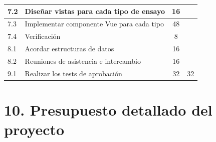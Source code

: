 \documentclass[11pt]{charter}
\begin{document}
\begin{table}[htpb]
\begin{tabular}{|l|l|c|c|}
7.2 & Diseñar vistas para cada tipo de ensayo & 16  &  \\ \hline
7.3 & Implementar componente Vue para cada tipo & 48  &  \\ \hline
7.4 & Verificación & 8  &  \\ \hline
8.1 & Acordar estructuras de datos & 16  &  \\ \hline
8.2 & Reuniones de asistencia e intercambio & 16  &  \\ \hline
9.1 & Realizar los tests de aprobación & 32  & 32 \\ \hline
\end{tabular}
\end{table}


\section{10. Presupuesto detallado del proyecto}
\label{sec:presupuesto}
\end{document}
